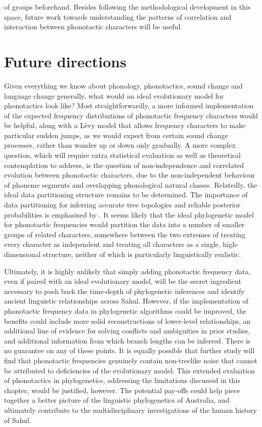 of groups beforehand. Besides following the methodological development in this space, future work towards understanding the patterns of correlation and interaction between phonotactic characters will be useful.

\hypertarget{future-directions}{%
\section{Future directions}\label{future-directions}}

Given everything we know about phonology, phonotactics, sound change and language change generally, what would an ideal evolutionary model for phonotactics look like? Most straightforwardly, a more informed implementation of the expected frequency distributions of phonotactic frequency characters would be helpful, along with a Lévy model that allows frequency characters to make particular sudden jumps, as we would expect from certain sound change processes, rather than wander up or down only gradually. A more complex question, which will require extra statistical evaluation as well as theoretical contemplation to address, is the question of non-independence and correlated evolution between phonotactic characters, due to the non-independent behaviour of phoneme segments and overlapping phonological natural classes. Relatedly, the ideal data partitioning structure remains to be determined. The importance of data partitioning for inferring accurate tree topologies and reliable posterior probabilities is emphasised by \autocite{brown_importance_2007}. It seems likely that the ideal phylogenetic model for phonotactic frequencies would partition the data into a number of smaller groups of related characters, somewhere between the two extremes of treating every character as independent and treating all characters as a single, high-dimensional structure, neither of which is particularly linguistically realistic.

Ultimately, it is highly unlikely that simply adding phonotactic frequency data, even if paired with an ideal evolutionary model, will be the secret ingredient necessary to push back the time-depth of phylogenetic inferences and identify ancient linguistic relationships across Sahul. However, if the implementation of phonotactic frequency data in phylogenetic algorithms could be improved, the benefits could include more solid reconstructions of lower-level relationships, an additional line of evidence for solving conflicts and ambiguities in prior studies, and additional information from which branch lengths can be inferred. There is no guarantee on any of these points. It is equally possible that further study will find that phonotactic frequencies genuinely contain non-treelike noise that cannot be attributed to deficiencies of the evolutionary model. This extended evaluation of phonotactics in phylogenetics, addressing the limitations discussed in this chapter, would be justified, however. The potential pay-offs could help piece together a better picture of the linguistic phylogenetics of Australia, and ultimately contribute to the multidisciplinary investigations of the human history of Sahul.

